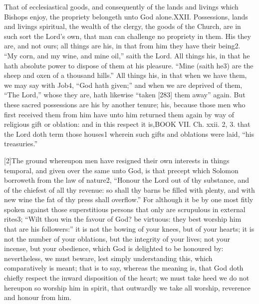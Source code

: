 That of ecclesiastical goods, and consequently of the lands and livings which Bishops enjoy, the propriety belongeth unto God alone.XXII. Possessions, lands and livings spiritual, the wealth of the clergy, the goods of the Church, are in such sort the Lord’s own, that man can challenge no propriety in them. His they are, and not ours; all things are his, in that from him they have their being2. “My corn, and my wine, and mine oil,” saith the Lord. All things his, in that he hath absolute power to dispose of them at his pleasure. “Mine (saith he3) are the sheep and oxen of a thousand hills.” All things his, in that when we have them, we may say with Job4, “God hath given;” and when we are deprived of them, “The Lord,” whose they are, hath likewise “taken [283] them away” again. But these sacred possessions are his by another tenure; his, because those men who first received them from him have unto him returned them again by way of religious gift or oblation: and in this respect it is,BOOK VII. Ch. xxii. 2, 3. that the Lord doth term those houses1 wherein such gifts and oblations were laid, “his treasuries.”

[2]The ground whereupon men have resigned their own interests in things temporal, and given over the same unto God, is that precept which Solomon borroweth from the law of nature2, “Honour the Lord out of thy substance, and of the chiefest of all thy revenue: so shall thy barns be filled with plenty, and with new wine the fat of thy press shall overflow.” For although it be by one most fitly spoken against those superstitious persons that only are scrupulous in external rites3; “Wilt thou win the favour of God? be virtuous: they best worship him that are his followers:” it is not the bowing of your knees, but of your hearts; it is not the number of your oblations, but the integrity of your lives; not your incense, but your obedience, which God is delighted to be honoured by: nevertheless, we must beware, lest simply understanding this, which comparatively is meant; that is to say, whereas the meaning is, that God doth chiefly respect the inward disposition of the heart; we must take heed we do not hereupon so worship him in spirit, that outwardly we take all worship, reverence and honour from him.

